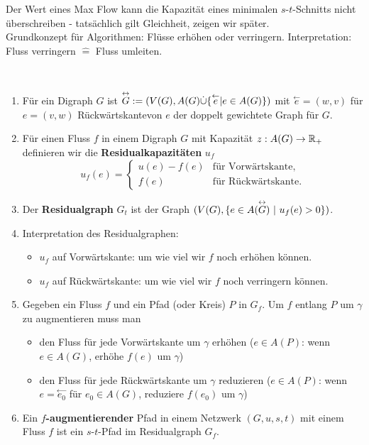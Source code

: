 Der Wert eines Max Flow kann die Kapazität eines minimalen $s$-$t$-Schnitts nicht überschreiben - tatsächlich gilt Gleichheit, zeigen wir später.\\[5pt]
Grundkonzept für Algorithmen: Flüsse erhöhen oder verringern. Interpretation: Fluss verringern $\widehat{=}$ Fluss umleiten.
\begin{definition}~
	\begin{enumerate}[1)]
		\item Für ein Digraph $G$ ist $\overset{\leftrightarrow}{G} := (V(G), A(G) \dot\cup \{\overset{\leftarrow}{e} \vert e \in A(G)\})$ mit $\overset{\leftarrow}{e} = (w,v)$ für $e=(v,w)$ \dq Rückwärtskante\dq von $e$ der doppelt gewichtete Graph für $G$.
		\item Für einen Fluss $f$ in einem Digraph $G$ mit Kapazität $z:A(G)\to \mathbb{R}_+$ definieren wir die \textbf{Residualkapazitäten} $u_f$ \[ u_f(e) = \begin{cases} u(e) - f(e) &\text{für Vorwärtskante,}\\ f(e) &\text{für Rückwärtskante.} \end{cases} \]
		\item Der \textbf{Residualgraph} $G_t$ ist der Graph $(V(G), \{e\in A(\overset{\leftrightarrow}{G})~\vert~ u_f(e) > 0\})$.
		\item Interpretation des Residualgraphen:
		\begin{itemize}
			\item $u_f$ auf Vorwärtskante: um wie viel wir $f$ noch erhöhen können.
			\item $u_f$ auf Rückwärtskante: um wie viel wir $f$ noch verringern können.
		\end{itemize}
	\item Gegeben ein Fluss $f$ und ein Pfad (oder Kreis) $P$ in $G_f$. Um $f$ entlang $P$ um $\gamma$ zu augmentieren muss man
	\begin{itemize}
		\item den Fluss für jede Vorwärtskante um $\gamma$ erhöhen ($e\in A(P)$: wenn $e \in A(G)$, erhöhe $f(e)$ um $\gamma$)
		\item den Fluss für jede Rückwärtskante um $\gamma$ reduzieren ($e \in A(P)$: wenn $e = \overset{\leftarrow}{e_0}$ für $e_0 \in A(G)$, reduziere $f(e_0)$ um $\gamma$)
	\end{itemize}
	\item Ein \textbf{$f$-augmentierender} Pfad in einem Netzwerk $(G, u, s, t)$ mit einem Fluss $f$ ist ein $s$-$t$-Pfad im Residualgraph $G_f$.
	\end{enumerate}
\end{definition}

